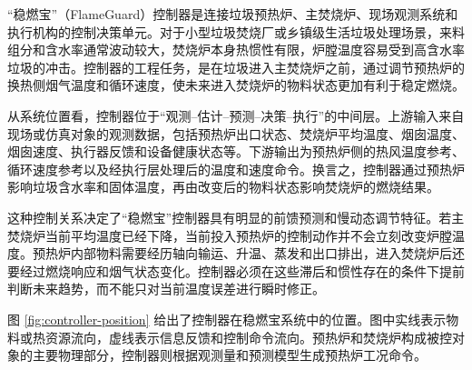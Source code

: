 \documentclass[UTF8,openany,zihao=-4,oneside]{ctexbook}
\begin{document}
“稳燃宝”（FlameGuard）控制器是连接垃圾预热炉、主焚烧炉、现场观测系统和执行机构的控制决策单元。对于小型垃圾焚烧厂或乡镇级生活垃圾处理场景，来料组分和含水率通常波动较大，焚烧炉本身热惯性有限，炉膛温度容易受到高含水率垃圾的冲击。控制器的工程任务，是在垃圾进入主焚烧炉之前，通过调节预热炉的换热侧烟气温度和循环速度，使未来进入焚烧炉的物料状态更加有利于稳定燃烧。

从系统位置看，控制器位于“观测--估计--预测--决策--执行”的中间层。上游输入来自现场或仿真对象的观测数据，包括预热炉出口状态、焚烧炉平均温度、烟囱温度、烟囱速度、执行器反馈和设备健康状态等。下游输出为预热炉侧的热风温度参考、循环速度参考以及经执行层处理后的温度和速度命令。换言之，控制器通过预热炉影响垃圾含水率和固体温度，再由改变后的物料状态影响焚烧炉的燃烧结果。

这种控制关系决定了“稳燃宝”控制器具有明显的前馈预测和慢动态调节特征。若主焚烧炉当前平均温度已经下降，当前投入预热炉的控制动作并不会立刻改变炉膛温度。预热炉内部物料需要经历轴向输运、升温、蒸发和出口排出，进入焚烧炉后还要经过燃烧响应和烟气状态变化。控制器必须在这些滞后和惯性存在的条件下提前判断未来趋势，而不能只对当前温度误差进行瞬时修正。

图 \ref{fig:controller-position} 给出了控制器在稳燃宝系统中的位置。图中实线表示物料或热资源流向，虚线表示信息反馈和控制命令流向。预热炉和焚烧炉构成被控对象的主要物理部分，控制器则根据观测量和预测模型生成预热炉工况命令。
\end{document}
